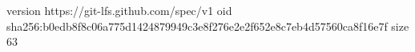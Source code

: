 version https://git-lfs.github.com/spec/v1
oid sha256:b0edb8f8c06a775d1424879949c3e8f276e2e2f652e8c7eb4d57560ca8f16e7f
size 63
